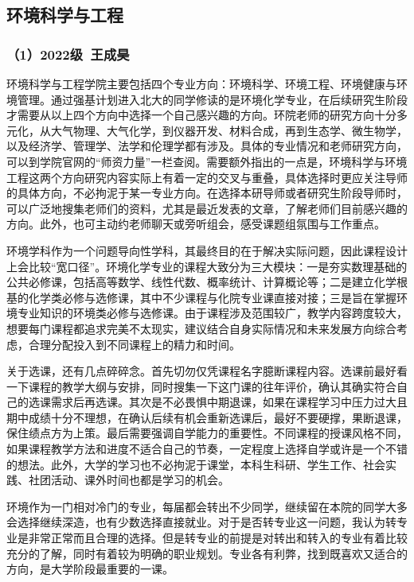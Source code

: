 \documentclass[11pt,oneside]{book}
\begin{document}
\subsection{环境科学与工程}

\subsubsection{（1）2022级\ 王成昊}

环境科学与工程学院主要包括四个专业方向：环境科学、环境工程、环境健康与环境管理。通过强基计划进入北大的同学修读的是环境化学专业，在后续研究生阶段才需要从以上四个方向中选择一个自己感兴趣的方向。环院老师的研究方向十分多元化，从大气物理、大气化学，到仪器开发、材料合成，再到生态学、微生物学，以及经济学、管理学、法学和伦理学都有涉及。具体的专业情况和老师研究方向，可以到学院官网的“师资力量”一栏查阅。需要额外指出的一点是，环境科学与环境工程这两个方向研究内容实际上有着一定的交叉与重叠，具体选择时更应关注导师的具体方向，不必拘泥于某一专业方向。在选择本研导师或者研究生阶段导师时，可以广泛地搜集老师们的资料，尤其是最近发表的文章，了解老师们目前感兴趣的方向。此外，也可主动约老师聊天或旁听组会，感受课题组氛围与工作重点。

环境学科作为一个问题导向性学科，其最终目的在于解决实际问题，因此课程设计上会比较“宽口径”。环境化学专业的课程大致分为三大模块：一是夯实数理基础的公共必修课，包括高等数学、线性代数、概率统计、计算概论等；二是建立化学根基的化学类必修与选修课，其中不少课程与化院专业课直接对接；三是旨在掌握环境专业知识的环境类必修与选修课。由于课程涉及范围较广，教学内容跨度较大，想要每门课程都追求完美不太现实，建议结合自身实际情况和未来发展方向综合考虑，合理分配投入到不同课程上的精力和时间。

关于选课，还有几点碎碎念。首先切勿仅凭课程名字臆断课程内容。选课前最好看一下课程的教学大纲与安排，同时搜集一下这门课的往年评价，确认其确实符合自己的选课需求后再选课。其次是不必畏惧中期退课，如果在课程学习中压力过大且期中成绩十分不理想，在确认后续有机会重新选课后，最好不要硬撑，果断退课，保住绩点方为上策。最后需要强调自学能力的重要性。不同课程的授课风格不同，如果课程教学方法和进度不适合自己的节奏，一定程度上选择自学或许是一个不错的想法。此外，大学的学习也不必拘泥于课堂，本科生科研、学生工作、社会实践、社团活动、课外时间也都是学习的机会。

环境作为一门相对冷门的专业，每届都会转出不少同学，继续留在本院的同学大多会选择继续深造，也有少数选择直接就业。对于是否转专业这一问题，我认为转专业是非常正常而且合理的选择。但是转专业的前提是对转出和转入的专业有着比较充分的了解，同时有着较为明确的职业规划。专业各有利弊，找到既喜欢又适合的方向，是大学阶段最重要的一课。
\end{document}
